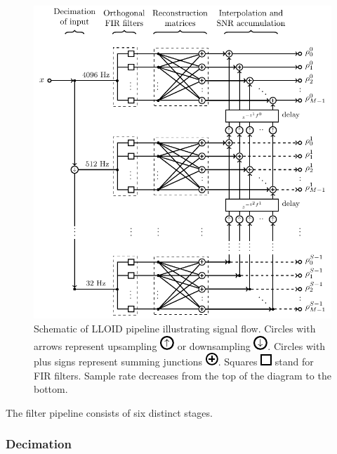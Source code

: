 \begin{figure}[htbp]
	\includegraphics{figures/lloid-diagram.pdf}
	\caption{Schematic of LLOID pipeline illustrating signal flow.  Circles with arrows represent upsampling \protect\includegraphics{figures/upsample-symbol.pdf} or downsampling \protect\includegraphics{figures/downsample-symbol.pdf}.  Circles with plus signs represent summing junctions \protect\includegraphics{figures/adder-symbol.pdf}.  Squares \protect\includegraphics{figures/fir-symbol.pdf} stand for FIR filters.  Sample rate decreases from the top of the diagram to the bottom.}
\end{figure}

The filter pipeline consists of six distinct stages.  

\subsubsection{Decimation}

